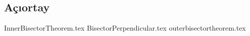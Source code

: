 \subsection{Açıortay}
{InnerBisectorTheorem.tex}
\newpage
{BisectorPerpendicular.tex}
\newpage
{outerbisectortheorem.tex}
\newpage